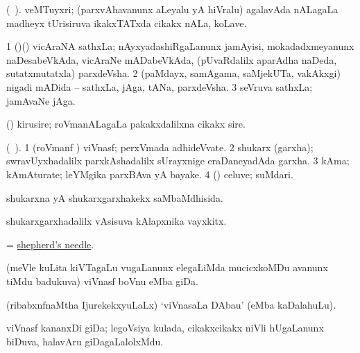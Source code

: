 \bentry
{} 
\gl{\nA}(\bava\ ). 
\bmng
 veMTuyxri; (parxvAhavanunx aLeyalu yA hiVralu) agalavAda nALagaLa madheyx tUrisiruva ikakxTATxda cikakx nALa, koLave. 
\emng
\eentry

\bentry
{} 
\gl{\nA}
\expl{}
\bmng
\bnum
\num{1} (\nAyxshA)(\ca) vicAraNA sathxLa; nAyxyadashiRgaLanunx jamAyisi, mokadadxmeyanunx naDesabeVkAda, vicAraNe mADabeVkAda, (pUvaRdalilx aparAdha naDeda, sutatxmutatxla) parxdeVsha. 
\num{2} (paMdayx, samAgama, saMjekUTa, \mo vakAkxgi) nigadi mADida -- sathxLa, jAga, tANa, parxdeVsha. 
\num{3} seVruva sathxLa; jamAvaNe jAga. 
\enum
\emng
\eentry

\bentry
{} 
\gl{\nA}
\expl{}
\bmng
 (\aMrashA) kirusire; roVmanALagaLa pakakxdalilxna cikakx sire. 
\emng
\eentry

\bentry
{} 
\gl{\nA}(\bava\ ). 
\bmng
\bnum
\num{1} (roVmanf \pu) viVnasf; perxVmada adhideVvate. 
\num{2} shukarx (garxha); swravUyxhadalilx parxkAshadalilx sUrayxnige eraDaneyadAda garxha. 
\num{3} kAma; kAmAturate; leYMgika parxBAva yA bayake. 
\num{4} (\kAparx) celuve; suMdari. 
\enum
\emng
\eentry

\bentry
{} 
\gl{\gu}
\expl{}
\bmng
 shukarxna yA shukarxgarxhakekx saMbaMdhisida. 
\emng
\eentry

\bentry
{} 
\gl{\nA}
\expl{}
\bmng
 shukarxgarxhadalilx vAsisuva kAlapxnika vayxkitx. 
\emng
\eentry

\bentry
{} 
\gl{\nA}
\expl{}
\bmng
 = \hyperref{kandict_s.pdf}{S}{shepherd's needle}{shepherd's needle}. 
\emng
\eentry

\bentry
{}
\gl{\nA}
\bmng
 (meVle kuLita kiVTagaLu \mo vugaLanunx elegaLiMda mucicxkoMDu avanunx tiMdu badukuva) viVnasf boVnu eMba giDa.  
\emng
\eentry

\bentry
{}
\gl{\nA}
\expl{}
\bmng
 (ribabxnfnaMtha IjurekekxyuLaLx) `viVnasaLa DAbau' (eMba kaDalahuLu). 
\emng
\eentry

\bentry
{}
\gl{\nA}
\expl{}
\bmng
 viVnasf kananxDi giDa; legoVsiya kulada, cikakxcikakx niVli hUgaLanunx biDuva, halavAru giDagaLalolxMdu. 
\emng
\eentry

